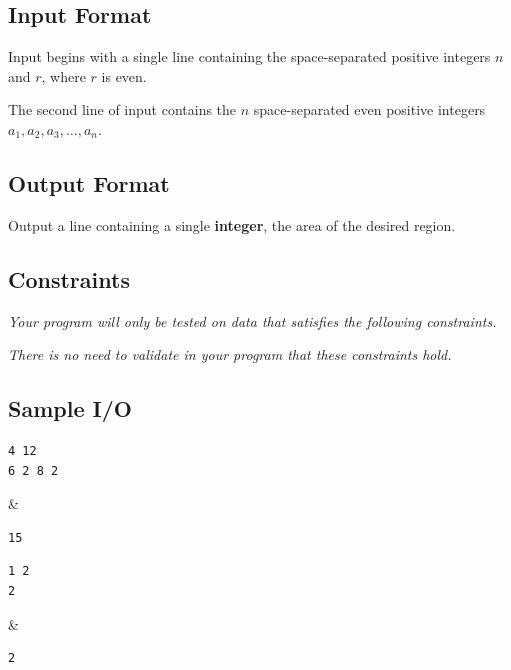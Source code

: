 \newpage

\subsection*{Input Format}

Input begins with a single line containing the space-separated positive integers $n$ and $r$, where $r$ is even.

The second line of input contains the $n$ space-separated even positive integers $a_1, a_2, a_3, \dots, a_n$.

\subsection*{Output Format}

Output a line containing a single \textbf{integer}, the area of the desired region.

\subsection*{Constraints}

\textit{Your program will only be tested on data that satisfies the following constraints.}


\textit{There is no need to validate in your program that these constraints hold.}

\subsection*{Sample I/O}

\begin{sampleIO}
\begin{verbatim}
4 12
6 2 8 2
\end{verbatim}
&
\begin{verbatim}
15
\end{verbatim}
\end{sampleIO}

\begin{sampleIO}
\begin{verbatim}
1 2
2
\end{verbatim}
&
\begin{verbatim}
2
\end{verbatim}
\end{sampleIO}


